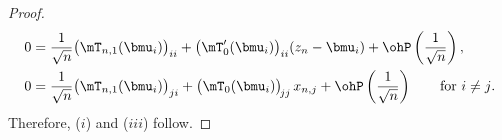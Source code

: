\begin{lemma}
\begin{proof}
\begin{align*}
            0
                &=
                \frac{1}{\sqrt{n}}
                \big(\mT_{n,1}(\bmu_i) \big)_{ii}
                +
                \big(\mT_0'(\bmu_i) \big)_{ii} ( z_n - \bmu_i )
                +
                \ohP\left( \frac{1}{\sqrt{n}} \right), \\
            0
                &=
                \frac{1}{\sqrt{n}}            
                \big(\mT_{n,1}(\bmu_i) \big)_{ji}
                +
                \big(\mT_0(\bmu_i) \big)_{\!jj} \,
                x_{n,j} 
                +
                \ohP\left( \frac{1}{\sqrt{n}} \right)
                \qquad \text{for $i \neq j$.}
        \end{align*}
        Therefore, ($i$) and ($iii$) follow.
    \end{proof}
\end{lemma}

